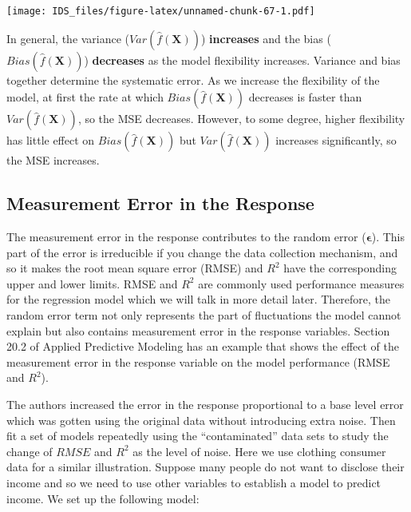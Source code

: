 \documentclass[12pt,]{krantz}
\begin{document}
\texttt{[image: IDS\_files/figure-latex/unnamed-chunk-67-1.pdf]}

In general, the variance (\(Var(\hat{f}(\mathbf{X}))\)) \textbf{increases} and the bias (\(Bias(\hat{f}(\mathbf{X}))\)) \textbf{decreases} as the model flexibility increases. Variance and bias together determine the systematic error. As we increase the flexibility of the model, at first the rate at which \(Bias(\hat{f}(\mathbf{X}))\) decreases is faster than \(Var (\hat{f} (\mathbf{X}))\), so the MSE decreases. However, to some degree, higher flexibility has little effect on \(Bias(\hat{f}(\mathbf{X}))\) but \(Var(\hat{f} (\mathbf{X}))\) increases significantly, so the MSE increases.

\hypertarget{measurement-error-in-the-response}{%
\subsection{Measurement Error in the Response}\label{measurement-error-in-the-response}}

The measurement error in the response contributes to the random error (\(\mathbf{\epsilon}\)). This part of the error is irreducible if you change the data collection mechanism, and so it makes the root mean square error (RMSE) and \(R^2\) have the corresponding upper and lower limits. RMSE and \(R^2\) are commonly used performance measures for the regression model which we will talk in more detail later. Therefore, the random error term not only represents the part of fluctuations the model cannot explain but also contains measurement error in the response variables. Section 20.2 of Applied Predictive Modeling \citep{APM} has an example that shows the effect of the measurement error in the response variable on the model performance (RMSE and \(R^2\)).

The authors increased the error in the response proportional to a base level error which was gotten using the original data without introducing extra noise. Then fit a set of models repeatedly using the ``contaminated'' data sets to study the change of \(RMSE\) and \(R^2\) as the level of noise. Here we use clothing consumer data for a similar illustration. Suppose many people do not want to disclose their income and so we need to use other variables to establish a model to predict income. We set up the following model:
\end{document}
